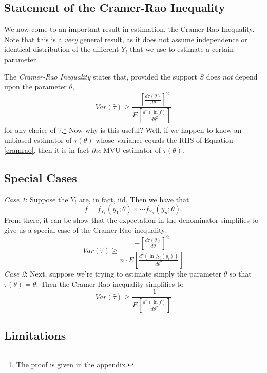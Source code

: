 \documentclass[a4paper,12pt]{scrartcl}
\begin{document}
\subsection{Statement of the Cramer-Rao Inequality}

We now come to an important result in estimation, the Cramer-Rao 
Inequality. Note that this is a \emph{very} general result, as it does 
not assume independence
or identical distribution of the different $Y_i$ that we use to 
estimate a certain parameter.

The \emph{Cramer-Rao Inequality} states that, provided the
support $S$ does \emph{not} depend upon the parameter $\theta$, 
   \begin{equation}
      \label{cramrao}
      Var(\hat{\tau})\geq\frac{-\left[ \frac{d\tau(\theta)}{d\theta}
	 \right]^2}{
	 E\left[ \frac{d^2(\ln f)}{d\theta^2} \right]}
   \end{equation}
for any choice of $\hat{\tau}$.\footnote{The proof is given in the 
appendix.}  Now why is this useful?  Well, if we 
happen to know an unbiased estimator of $\tau(\theta)$ whose variance
equals the RHS of Equation \ref{cramrao}, then it is in fact \emph{the}
MVU estimator of $\tau(\theta)$.

\subsection{Special Cases}

{\sl Case 1}: Suppose the $Y_i$ are, in fact, iid. Then we have that
   \[ f = f_{Y_1}(y_1 ; \theta) \times \cdots f_{Y_n}(y_n ; \theta).\]
   From there, it can be show that the expectation in the denominator
   simplifies to give us a special case of the Cramer-Rao inequality:
   \begin{equation}
      \label{cramrao.sp1}
      Var(\hat{\tau})\geq\frac{-\left[ \frac{d\tau(\theta)}{d\theta}
	 \right]^2}{
	 n \cdot E\left[ \frac{d^2(\ln f_{Y_i}(y_i))}{d\theta^2} \right]}
   \end{equation}
{\sl Case 2}: Next, suppose we're trying to estimate simply the
   parameter $\theta$ so that $\tau(\theta) = \theta$. Then the
   Cramer-Rao inequality simplifies to
   \begin{equation}
      \label{cramrao.sp2}
      Var(\hat{\tau})\geq\frac{-1}{
	 E\left[ \frac{d^2(\ln f)}{d\theta^2} \right]}
   \end{equation}

\subsection{Limitations}
\end{document}
